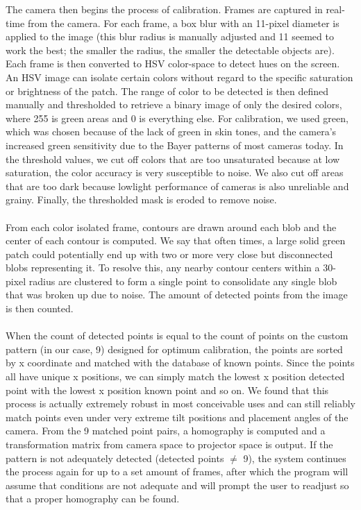 \documentclass[twoside,twocolumn]{article}
\begin{document}
The camera then begins the process of calibration. Frames are captured in real-time from the camera. For each frame, a box blur with an 11-pixel diameter is applied to the image (this blur radius is manually adjusted and 11 seemed to work the best; the smaller the radius, the smaller the detectable objects are). Each frame is then converted to HSV color-space to detect hues on the screen. An HSV image can isolate certain colors without regard to the specific saturation or brightness of the patch. The range of color to be detected is then defined manually and thresholded to retrieve a binary image of only the desired colors, where 255 is green areas and 0 is everything else. For calibration, we used green, which was chosen because of the lack of green in skin tones, and the camera's increased green sensitivity due to the Bayer patterns of most cameras today. In the threshold values, we cut off colors that are too unsaturated because at low saturation, the color accuracy is very susceptible to noise. We also cut off areas that are too dark because lowlight performance of cameras is also unreliable and grainy. Finally, the thresholded mask is eroded to remove noise.\\ \\
From each color isolated frame, contours are drawn around each blob and the center of each contour is computed. We say that often times, a large solid green patch could potentially end up with two or more very close but disconnected blobs representing it. To resolve this, any nearby contour centers within a 30-pixel radius are clustered to form a single point to consolidate any single blob that was broken up due to noise. The amount of detected points from the image is then counted. \\ \\
When the count of detected points is equal to the count of points on the custom pattern (in our case, 9) designed for optimum calibration, the points are sorted by x coordinate and matched with the database of known points. Since the points all have unique x positions, we can simply match the lowest x position detected point with the lowest x position known point and so on. We found that this process is actually extremely robust in most conceivable uses and can still reliably match points even under very extreme tilt positions and placement angles of the camera. From the 9 matched point pairs, a homography is computed and a transformation matrix from camera space to projector space is output. If the pattern is not adequately detected (detected points $\neq$ 9), the system continues the process again for up to a set amount of frames, after which the program will assume that conditions are not adequate and will prompt the user to readjust so that a proper homography can be found.\\ \\
\end{document}
